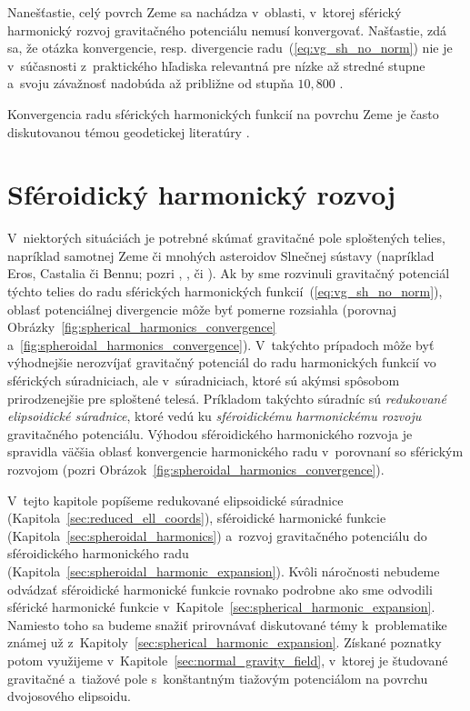 \documentclass[a4paper, 12pt]{book}
\begin{document}
Nanešťastie, celý povrch Zeme sa nachádza v~oblasti, v~ktorej sférický 
harmonický rozvoj gravitačného potenciálu nemusí konvergovať.  Našťastie, zdá 
sa, že otázka konvergencie, resp. divergencie radu~(\ref{eq:vg_sh_no_norm}) nie 
je v~súčasnosti z~praktického hľadiska relevantná pre nízke až stredné stupne 
a~svoju závažnosť nadobúda až približne od stupňa $10{,}800$ 
\parencite{Hirt2016,Rexer2017}.

Konvergencia radu sférických harmonických funkcií na povrchu Zeme je často 
diskutovanou témou geodetickej literatúry 
\parencite{Hotine,Borre_chapter4,MoritzAdvancedGeodesy,Sjoberg1980,Jekeli1983,SansoGeoidDetermination}.







\chapter{Sféroidický harmonický rozvoj}
\label{sec:spheroidal_harmonics_chapter}

V~niektorých situáciách je potrebné skúmať gravitačné pole sploštených telies, 
napríklad samotnej Zeme či mnohých asteroidov Slnečnej sústavy (napríklad Eros, 
Castalia či Bennu; pozri \cite{Garmier2001}, \cite{Hu2015}, \cite{Sebera2016} 
či \cite{Reimond2016}).  Ak by sme rozvinuli gravitačný potenciál týchto telies 
do radu sférických harmonických funkcií~(\ref{eq:vg_sh_no_norm}), oblasť 
potenciálnej divergencie môže byť pomerne rozsiahla (porovnaj 
Obrázky~\ref{fig:spherical_harmonics_convergence} 
a~\ref{fig:spheroidal_harmonics_convergence}).  V~takýchto prípadoch môže byť 
výhodnejšie nerozvíjať gravitačný potenciál do radu harmonických funkcií vo 
sférických súradniciach, ale v~súradniciach, ktoré sú akýmsi spôsobom 
prirodzenejšie pre sploštené telesá.  Príkladom takýchto súradníc sú 
\emph{redukované elipsoidické súradnice}, ktoré vedú ku \emph{sféroidickému 
harmonickému rozvoju} gravitačného potenciálu.  Výhodou sféroidického 
harmonického rozvoja je spravidla väčšia oblasť konvergencie harmonického radu 
v~porovnaní so sférickým rozvojom (pozri 
Obrázok~\ref{fig:spheroidal_harmonics_convergence}).

V~tejto kapitole popíšeme redukované elipsoidické súradnice 
(Kapitola~\ref{sec:reduced_ell_coords}), sféroidické harmonické funkcie 
(Kapitola~\ref{sec:spheroidal_harmonics}) a~rozvoj gravitačného potenciálu do 
sféroidického harmonického radu 
(Kapitola~\ref{sec:spheroidal_harmonic_expansion}).  Kvôli náročnosti nebudeme 
odvádzať sféroidické harmonické funkcie rovnako podrobne ako sme odvodili 
sférické harmonické funkcie v~Kapitole~\ref{sec:spherical_harmonic_expansion}.  
Namiesto toho sa budeme snažiť prirovnávať diskutované témy k~problematike 
známej už z~Kapitoly~\ref{sec:spherical_harmonic_expansion}.  Získané poznatky 
potom využijeme v~Kapitole~\ref{sec:normal_gravity_field}, v~ktorej je 
študované gravitačné a~tiažové pole s~konštantným tiažovým potenciálom na 
povrchu dvojosového elipsoidu.
\end{document}
